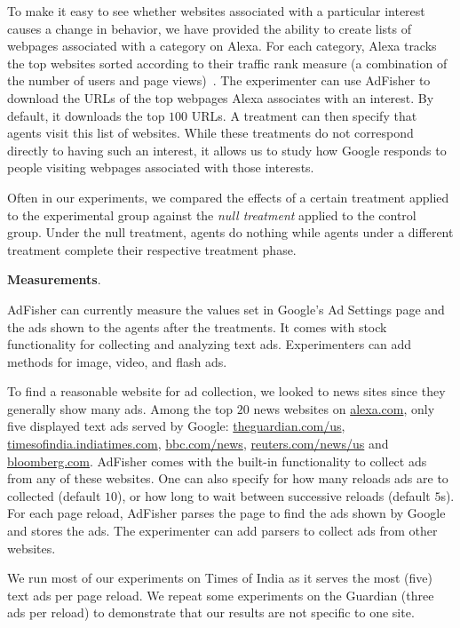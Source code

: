 \documentclass{article}
\makeatletter
\newcommand\gobblepars{\@ifnextchar\par {\expandafter\gobblepars\@gobble}{}}
\renewcommand{\paragraph}[1]{\smallskip\noindent\textbf{#1}.\ \ \gobblepars}
\makeatother
\begin{document}
To make it easy to see whether websites associated with a particular interest causes a change in behavior, we have provided the ability to create lists of webpages associated with a category on Alexa.  For each category, Alexa tracks the top websites sorted according to their traffic rank measure (a combination of the number of users and page views)~\cite{alexa}.
The experimenter can use AdFisher to download the URLs of the top webpages Alexa associates with an interest.  By default, it downloads the top  $100$ URLs. A treatment can then specify that agents visit this list of websites. While these treatments do not correspond directly to having such an interest, it allows us to study how Google responds to people visiting webpages associated with those interests.

Often in our experiments, we compared the effects of a certain treatment applied to the experimental group against the \emph{null treatment} applied to the control group.  Under the null treatment, agents do nothing while agents under a different treatment complete their respective treatment phase.



\paragraph{Measurements}\label{sec:col}
AdFisher can currently measure the values set in Google's Ad Settings page and the ads shown to the agents after the treatments.
It comes with stock functionality for collecting and analyzing text ads.  Experimenters can add methods for image, video, and flash ads.



To find a reasonable website for ad collection, we looked to news sites since they generally show many ads.
Among the top $20$ news websites on \url{alexa.com}, only five displayed text ads served by Google:
\url{theguardian.com/us}, \url{timesofindia.indiatimes.com}, \url{bbc.com/news}, \url{reuters.com/news/us} and \url{bloomberg.com}. AdFisher comes with the built-in functionality to collect ads from any of these websites. One can also specify for how many reloads ads are to collected (default $10$), or how long to wait between successive reloads (default $5$s). For each page reload, AdFisher parses the page to find the ads shown by Google and stores the ads. The experimenter can add parsers to collect ads from other websites.

We run most of our experiments on Times of India as it serves the most (five) text ads per page reload. We repeat some experiments on the Guardian (three ads per reload) to demonstrate that our results are not specific to one site. 
\end{document}
